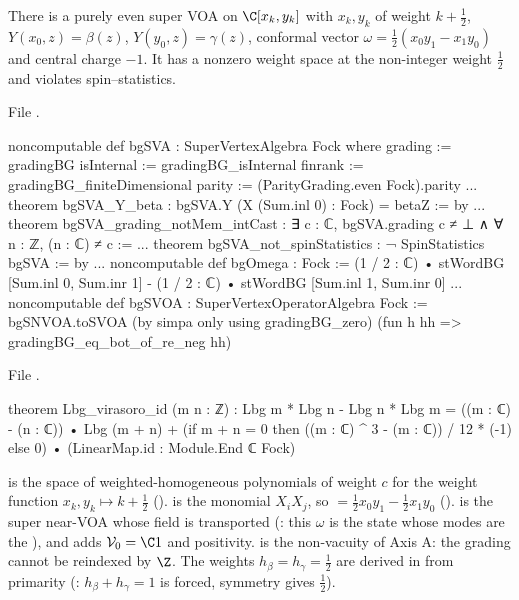 \begin{theorem}\label{l17:thm:bgsvoa}
There is a purely even super VOA  on $\C[x_k,y_k]$ with $x_k,y_k$ of weight $k+\frac12$,
$Y(x_0,z)=\beta(z)$, $Y(y_0,z)=\gamma(z)$, conformal vector
$\omega=\frac12(x_0y_1-x_1y_0)$ and central charge $-1$. It has a nonzero weight space at the
non-integer weight $\frac12$ and violates spin--statistics.
\end{theorem}
\noindent File .
\begin{leancode}
noncomputable def bgSVA : SuperVertexAlgebra Fock where
  grading := gradingBG
  isInternal := gradingBG_isInternal
  finrank := gradingBG_finiteDimensional
  parity := (ParityGrading.even Fock).parity
...
theorem bgSVA_Y_beta : bgSVA.Y (X (Sum.inl 0) : Fock) = betaZ := by
...
theorem bgSVA_grading_notMem_intCast :
    ∃ c : ℂ, bgSVA.grading c ≠ ⊥ ∧ ∀ n : ℤ, (n : ℂ) ≠ c :=
...
theorem bgSVA_not_spinStatistics : ¬ SpinStatistics bgSVA := by
...
noncomputable def bgOmega : Fock :=
  (1 / 2 : ℂ) • stWordBG [Sum.inl 0, Sum.inr 1]
    - (1 / 2 : ℂ) • stWordBG [Sum.inl 1, Sum.inr 0]
...
noncomputable def bgSVOA : SuperVertexOperatorAlgebra Fock :=
  bgSNVOA.toSVOA (by simpa only using gradingBG_zero) (fun h hh => gradingBG_eq_bot_of_re_neg hh)
\end{leancode}
\noindent File .
\begin{leancode}
theorem Lbg_virasoro_id (m n : ℤ) :
    Lbg m * Lbg n - Lbg n * Lbg m
      = ((m : ℂ) - (n : ℂ)) • Lbg (m + n)
        + (if m + n = 0 then ((m : ℂ) ^ 3 - (m : ℂ)) / 12 * (-1) else 0)
            • (LinearMap.id : Module.End ℂ Fock)
\end{leancode}
\begin{dictionary}
 is the space of weighted-homogeneous polynomials of weight $c$ for the weight
function $x_k,y_k\mapsto k+\frac12$ ().  is the monomial $X_iX_j$, so
 $=\frac12x_0y_1-\frac12x_1y_0$ ().  is the super near-VOA
whose  field is  transported (: this $\omega$
is the state whose modes are the ), and  adds $\lseventeenV_0=\C1$ and
positivity.  is the non-vacuity of Axis A: the grading cannot be
reindexed by $\Z$. The weights $h_\beta=h_\gamma=\frac12$ are derived in 
from primarity (: $h_\beta+h_\gamma=1$ is forced, symmetry gives $\frac12$).
\end{dictionary}
